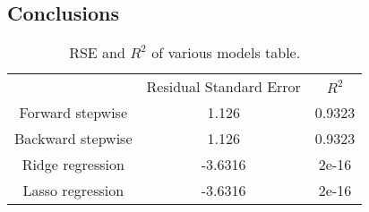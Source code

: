 \subsection{Conclusions}

\begin{table}[h]
	\centering
	\begin{tabular}{||c | c | c ||} 
						 & Residual Standard Error & $R^2$ \\
		Forward stepwise & 1.126 & 0.9323 \\
		\hline
		Backward stepwise & 1.126 & 0.9323 \\
		\hline
		Ridge regression & -3.6316 & 2e-16 \\
		\hline
		Lasso regression & -3.6316 & 2e-16 \\
		\hline
	\end{tabular}
	\caption{RSE and $R^2$ of various models table.}
	\label{table:RegEvalParams}
\end{table}